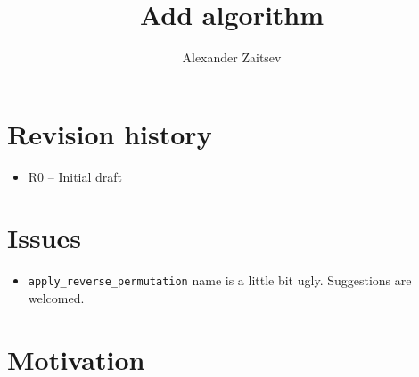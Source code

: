 \documentclass{wg21}
\title{Add \cc{std::apply_permutation} algorithm}
\author{Alexander Zaitsev}{zamazan4ik@tut.by, zamazan4ik@gmail.com}
\newcommand{\cc}[1]{\texttt{#1}}
\begin{document}
\maketitle

\section{Revision history}
\begin{itemize}
  \item R0 -- Initial draft
\end{itemize}

\section{Issues}
\begin{itemize}
    \item \cc{apply_reverse_permutation} name is a little bit ugly. Suggestions are welcomed.
\end{itemize}

\section{Motivation}
\end{document}
